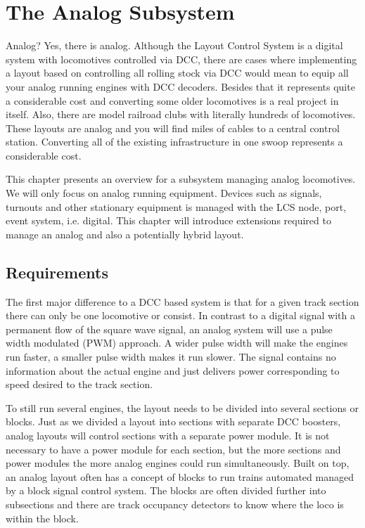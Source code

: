 \chapter{The Analog Subsystem}

Analog? Yes, there is analog. Although the Layout Control System is a digital system with locomotives controlled via DCC, there are cases where implementing a layout based on controlling all rolling stock via DCC would mean to equip all your analog running engines with DCC decoders. Besides that it represents quite a considerable cost and converting some older locomotives is a real project in itself. Also, there are model railroad clubs with literally hundreds of locomotives. These layouts are analog and you will find miles of cables to a central control station. Converting all of the existing infrastructure in one swoop represents a considerable cost.

This chapter presents an overview for a subsystem managing analog locomotives. We will only focus on analog running equipment. Devices such as signals, turnouts and other stationary equipment is managed with the LCS node, port, event system, i.e. digital. This chapter will introduce extensions required to manage an analog and also a potentially hybrid layout.

\section{Requirements}

The first major difference to a DCC based system is that for a given track section there can only be one locomotive or consist. In contrast to a digital signal with a permanent flow of the square wave signal, an analog system will use a pulse width modulated (PWM) approach. A wider pulse width will make the engines run faster, a smaller pulse width makes it run slower. The signal contains no information about the actual engine and just delivers power corresponding to speed desired to the track section.

\begin{center}
\end{center}

To still run several engines, the layout needs to be divided into several sections or blocks. Just as we divided a layout into sections with separate DCC boosters, analog layouts will control sections with a separate power module. It is not necessary to have a power module for each section, but the more sections and power modules the more analog engines could run simultaneously. Built on top, an analog layout often has a concept of blocks to run trains automated managed by a block signal control system. The blocks are often divided further into subsections and there are track occupancy detectors to know where the loco is within the block.

